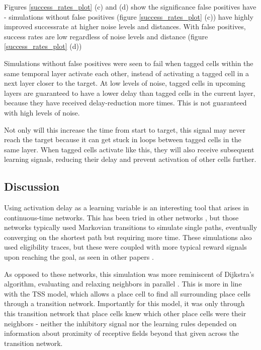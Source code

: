 \documentclass{article}
\begin{document}
    Figures \ref{success_rates_plot} (c) and (d) show the significance false positives have - simulations without false positives (figure \ref{success_rates_plot} (c)) have highly improved successrate at higher noise levels and distances. With false positives, success rates are low regardless of noise levels and distance (figure \ref{success_rates_plot} (d))

    Simulations without false positives were seen to fail when tagged cells within the same temporal layer activate each other, instead of activating a tagged cell in a next layer closer to the target. At low levels of noise, tagged cells in upcoming layers are guaranteed to have a lower delay than tagged cells in the current layer, because they have received delay-reduction more times. This is not guaranteed with high levels of noise.

    Not only will this increase the time from start to target, this signal may never reach the target because it can get stuck in loops between tagged cells in the same layer. When tagged cells activate like this, they will also receive subsequent learning signals, reducing their delay and prevent activation of other cells further.

    \subsection{Discussion}
    Using activation delay as a learning variable is an interesting tool that arises in continuous-time networks. This has been tried in other networks \parencite{Krichmar2022, Niedermeier2023}, but those networks typically used Markovian transitions to simulate single paths, eventually converging on the shortest path but requiring more time. These simulations also used eligibility traces, but these were coupled with more typical reward signals upon reaching the goal, as seen in other papers \parencite{Bellec2020}.

    As opposed to these networks, this simulation was more reminiscent of Dijkstra's algorithm, evaluating and relaxing neighbors in parallel \parencite{Dijkstra1960}. This is more in line with the TSS model, which allows a place cell to find all surrounding place cells through a transition network. Importantly for this model, it was only through this transition network that place cells knew which other place cells were their neighbors - neither the inhibitory signal nor the learning rules depended on information about proximity of receptive fields beyond that given across the transition network.
\end{document}
